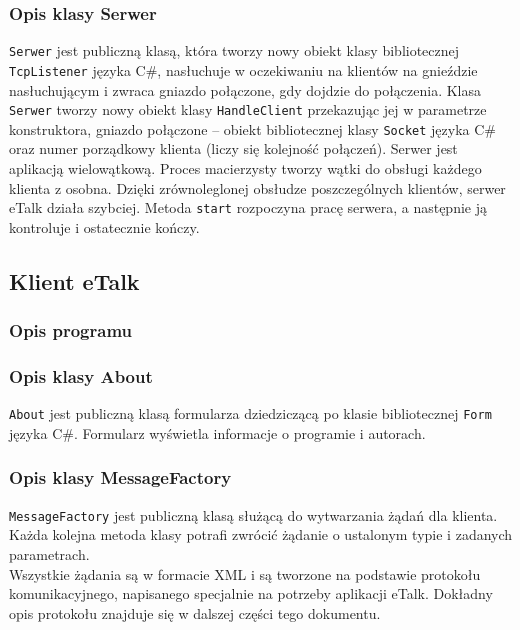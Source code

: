 \documentclass[a4paper,12pt]{article}
\begin{document}
\subsubsection[Opis klasy Serwer]{Opis klasy Serwer}
\texttt{Serwer} jest publiczną klasą, która tworzy nowy obiekt klasy bibliotecznej \texttt{TcpListener} języka C\#, nasłuchuje w oczekiwaniu na klientów na gnieździe nasłuchującym i zwraca gniazdo połączone, gdy dojdzie do połączenia.
Klasa \texttt{Serwer} tworzy nowy obiekt klasy \texttt{HandleClient} przekazując jej w parametrze konstruktora, gniazdo połączone -- obiekt bibliotecznej klasy \texttt{Socket} języka C\# oraz numer porządkowy klienta (liczy się kolejność połączeń). Serwer jest aplikacją wielowątkową. Proces macierzysty tworzy wątki do obsługi każdego klienta z osobna. Dzięki zrównoleglonej obsłudze poszczególnych klientów, serwer eTalk działa szybciej. Metoda \texttt{start} rozpoczyna pracę serwera, a następnie ją kontroluje i ostatecznie kończy.


\subsection[Klient eTalk]{Klient eTalk}
\subsubsection[Opis programu]{Opis programu}

\subsubsection[Opis klasy About]{Opis klasy About}
\texttt{About} jest publiczną klasą formularza dziedziczącą po klasie bibliotecznej \texttt{Form}
języka C\#. Formularz wyświetla informacje o programie i autorach.

\subsubsection[Opis klasy MessageFactory]{Opis klasy MessageFactory}
\texttt{MessageFactory} jest publiczną klasą służącą do wytwarzania żądań dla klienta.\\
Każda kolejna metoda klasy potrafi zwrócić żądanie o ustalonym typie i zadanych parametrach.\\
Wszystkie żądania są w formacie XML i są tworzone na podstawie protokołu komunikacyjnego, napisanego specjalnie na potrzeby aplikacji eTalk. Dokładny opis protokołu znajduje się w dalszej części tego dokumentu.
\end{document}
